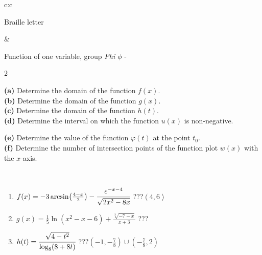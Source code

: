 \documentclass[10pt]{report}
\begin{document}
\begin{tabular}{c:c}
\begin{minipage}[c][104.5mm][t]{0.5\linewidth}
\begin{center}
\begin{minipage}{0.20\linewidth}
\begin{center}
{\small Braille letter}
\end{center}
\end{minipage}
\end{center}
\end{minipage}
&
\begin{minipage}[c][104.5mm][t]{0.5\linewidth}
\begin{center}
\vspace{7mm}
{\huge Function of one variable, group \textit{Phi $\phi$} -}\\[5mm]
\begin{minipage}{0.95\linewidth}
\begin{center}
{\small \begin{multicols}{2} \raggedright
\textbf{(a)} Determine the domain of the function \(f(x)\). \\[1mm]
\textbf{(b)} Determine the domain of the function \(g(x)\). \\[1mm]
\textbf{(c)} Determine the domain of the function \(h(t)\). \\[1mm]
\textbf{(d)} Determine the interval on which the function \(u(x)\) is non-negative. \par \columnbreak
\textbf{(e)} Determine the value of the function \(\varphi(t)\) at the point \(t_0\). \\[1mm]
\textbf{(f)} Determine the number of intersection points of the function plot \(w(x)\) with the \(x\)-axis. \\[1mm]
\end{multicols}
}
\end{center}
\end{minipage}
\\[4mm]
\begin{minipage}{0.79\linewidth}
\begin{center}
\begin{varwidth}{\linewidth}
\begin{enumerate}
\small
\item $f(x) = -3\arcsin\!\left( \frac{4-x}{2} \right) - \cfrac{e^{-x-4}}{\sqrt{2x^2-8x}}$\quad \dotfill\; ???\;\dotfill \quad $\left(4 , 6\right\rangle$
\item $g(x) = \frac{1}{5} \ln{\!(x^2-x-6)}+\frac{\sqrt[3]{-7-x}}{x+3}$\quad \dotfill\; ???\;\dotfill {}
\item $h(t) = \cfrac{\sqrt{4-t^2}}{\log_8(8+8t)}$\quad \dotfill\; ???\;\dotfill \quad $\left(-1 , -\frac{7}{8}\right)\cup\left(-\frac{7}{8} , 2\right)$

\end{enumerate}
\end{varwidth}
\end{center}
\end{minipage}
\end{center}
\end{minipage}
\end{tabular}
\end{document}
